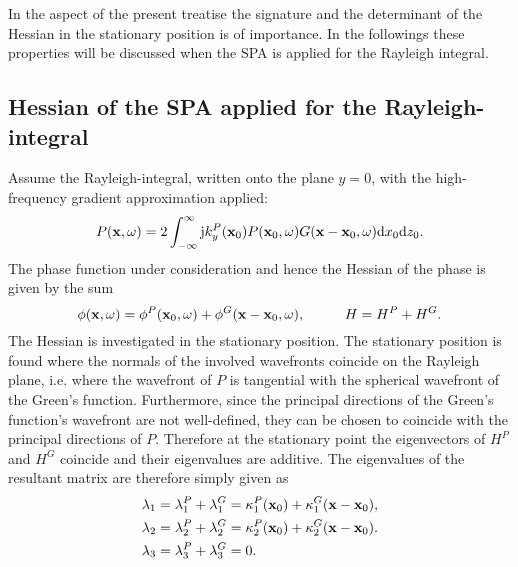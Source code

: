 \vspace{3mm}
In the aspect of the present treatise the signature and the determinant of the Hessian in the stationary position is of importance.
In the followings these properties will be discussed when the SPA is applied for the Rayleigh integral.


\subsection{Hessian of the SPA applied for the Rayleigh-integral}

Assume the Rayleigh-integral, written onto the plane $y = 0$, with the high-frequency gradient approximation applied:
\begin{equation}
P(\mathbf{x},\omega) = 2 \int_{-\infty}^{\infty} \mathrm{j} k_y^P(\mathbf{x}_0) P(\mathbf{x}_0, \omega) G(\mathbf{x}-\mathbf{x}_0,\omega) \mathrm{d} x_0  \mathrm{d} z_0.
\end{equation}
The phase function under consideration and hence the Hessian of the phase is given by the sum
\begin{equation}
\phi(\mathbf{x},\omega) = \phi^P(\mathbf{x}_0,\omega) + \phi^G(\mathbf{x}-\mathbf{x}_0,\omega), \hspace{1cm} H = H^P+ H^G.
\end{equation}
The Hessian is investigated in the stationary position.
The stationary position is found where the normals of the involved wavefronts coincide on the Rayleigh plane, i.e. where the wavefront of $P$ is tangential with the spherical wavefront of the Green's function.
Furthermore, since the principal directions of the Green's function's wavefront are not well-defined, they can be chosen to coincide with the principal directions of $P$.
Therefore at the stationary point the eigenvectors of $H^P$ and $H^G$ coincide and their eigenvalues are additive.
The eigenvalues of the resultant matrix are therefore simply given as
\begin{align}
\lambda_1 &= \lambda_1^P + \lambda_1^G = \kappa_1^P(\mathbf{x}_0) + \kappa_1^G(\mathbf{x}-\mathbf{x}_0), \\
\lambda_2 &= \lambda_2^P + \lambda_2^G = \kappa_2^P(\mathbf{x}_0) + \kappa_2^G(\mathbf{x}-\mathbf{x}_0). \\
\lambda_3 &= \lambda_3^P + \lambda_3^G = 0.
\end{align}

